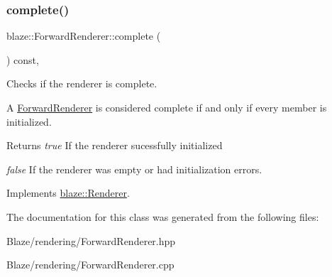\subsubsection{\texorpdfstring{complete()}{complete()}}
{\footnotesize\ttfamily blaze\+::\+Forward\+Renderer\+::complete (\begin{DoxyParamCaption}{ }\end{DoxyParamCaption}) const\hspace{0.3cm}{\ttfamily [inline]}, {\ttfamily [virtual]}}



Checks if the renderer is complete. 

A \hyperlink{classblaze_1_1ForwardRenderer}{Forward\+Renderer} is considered complete if and only if every member is initialized.

\begin{DoxyReturn}{Returns}
{\itshape true} If the renderer sucessfully initialized 

{\itshape false} If the renderer was empty or had initialization errors. 
\end{DoxyReturn}


Implements \hyperlink{classblaze_1_1Renderer}{blaze\+::\+Renderer}.



The documentation for this class was generated from the following files\+:\begin{DoxyCompactItemize}
\item 
Blaze/rendering/Forward\+Renderer.\+hpp\item 
Blaze/rendering/Forward\+Renderer.\+cpp\end{DoxyCompactItemize}
